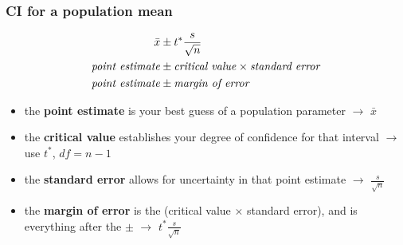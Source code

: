 %




\begin{frame}
\frametitle{CI for a population mean}
\begin{align*}
\bar{x} & \pm t^{*} \frac{s}{\sqrt{n}}\\
\mbox{\emph{point estimate}} & \pm \mbox{\emph{critical value}} \times \mbox{\emph{standard error}}  \\
\mbox{\emph{point estimate}} & \pm \mbox{\emph{margin of error}}
\end{align*}
\vskip5pt
\begin{itemize}
    \item
    the \textbf{point estimate} is your best guess of a population parameter  $\rightarrow$ $\bar{x}$
    \item
    the \textbf{critical value} establishes your degree of confidence for that interval  $\rightarrow$ use $t^*$, $df=n-1$
    \item
    the \textbf{standard error} allows for uncertainty in that point estimate  $\rightarrow$ $\frac{s}{\sqrt{n}}$
    \item
   the \textbf{margin of error} is the (critical value $\times$ standard error), and is everything after the $\pm$  $\rightarrow$  $t^* \frac{s}{\sqrt{n}}$
\end{itemize}
\end{frame}


